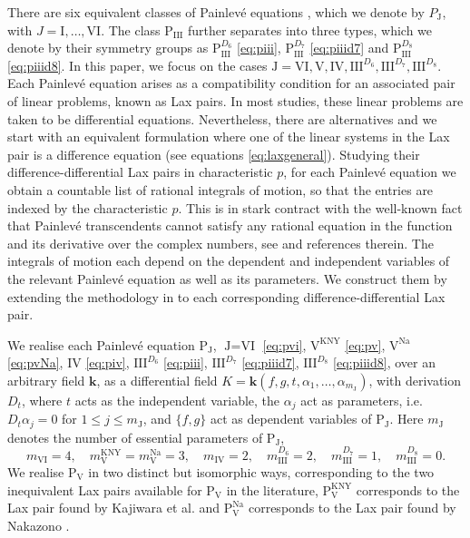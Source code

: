 \documentclass[a4paper,reqno]{amsart}
\numberwithin{equation}{section}
\numberwithin{figure}{section}
\theoremstyle{remark}
\newcommand\Pthree{\textrm{P}_{\textrm{III}}}
\newcommand\Pfive{\textrm{P}_{\textrm{V}}}
\newcommand\PJ{\textrm{P}_{\textrm{J}}}
\begin{document}
There are six equivalent classes of Painlev\'e equations \cite[\href{https://dlmf.nist.gov/32.2}{(32.2)}]{NIST:DLMF}, which we denote by $P_{\textrm{J}}$, with $J=\textrm{I},\ldots, \textrm{VI}$. The class $\Pthree$ further separates into three types, which we denote by their symmetry groups as $\Pthree^{D_6}$  \eqref{eq:piii}, $\Pthree^{D_7}$  \eqref{eq:piiid7} and $\Pthree^{D_8}$  \eqref{eq:piiid8}. In this paper, we focus on the cases $\textrm{J}=\textrm{VI},\textrm{V},\textrm{IV},\textrm{III}^{D_6},\textrm{III}^{D_7},\textrm{III}^{D_8}$. Each Painlev\'e equation arises as a compatibility condition for an associated pair of linear problems, known as Lax pairs. In most studies, these linear problems are taken to be differential equations. Nevertheless, there are alternatives and we start with an equivalent formulation where one of the linear systems in the Lax pair is a difference equation (see equations \eqref{eq:laxgeneral}). Studying their difference-differential Lax pairs in characteristic $p$, for each Painlev\'e equation we obtain a countable list of rational integrals of motion, so that the entries are indexed by the characteristic $p$.
This is in stark contract with the well-known fact that Painlev\'e transcendents cannot satisfy any rational equation in the function and its derivative over the complex numbers, see \cite{umemura1998painleve,nagloo_21,nagloo_pillay_14} and references therein. The integrals of motion each depend on the dependent and independent variables of the relevant Painlev\'e equation as well as its parameters. We construct them by extending the methodology in \cite{joshiroffelsen} to each corresponding difference-differential Lax pair.

We realise each Painlev\'e equation $\PJ$, $\textrm{J}=\textrm{VI}$ \eqref{eq:pvi}, $\textrm{V}^\text{KNY}$ \eqref{eq:pv}, $\textrm{V}^\text{Na}$ \eqref{eq:pvNa}, $\textrm{IV}$ \eqref{eq:piv}, $\textrm{III}^{D_6}$ \eqref{eq:piii}, $\textrm{III}^{D_7}$ \eqref{eq:piiid7}, $\textrm{III}^{D_8}$ \eqref{eq:piiid8}, over an arbitrary field $\mathbf{k}$, as a differential field $K=\mathbf{k}(f,g,t,\alpha_1,\ldots,\alpha_{m_{\textrm{J}}})$, with derivation $D_t$, where $t$ acts as the independent variable, the $\alpha_j$ act as parameters, i.e. $D_t\alpha_j=0$ for $1\leq j\leq m_{\textrm{J}}$, and $\{f,g\}$ act as dependent variables of $\PJ$. Here $m_{\textrm{J}}$ denotes the number of essential parameters of $\PJ$,
\begin{equation*}
    m_\textrm{VI}=4,\quad m_\textrm{V}^\text{KNY}=m_\textrm{V}^\text{Na}=3,\quad m_\textrm{IV}=2,\quad m_\textrm{III}^{D_6}=2,\quad m_\textrm{III}^{D_7}=1,\quad m_\textrm{III}^{D_8}=0.
\end{equation*}
We realise $\Pfive$ in two distinct but isomorphic ways, corresponding to the two inequivalent Lax pairs available for $\Pfive$ in the literature,
$\Pfive^\text{KNY}$ corresponds to the Lax pair found by Kajiwara et al. \cite{KNY2017} and 
$\Pfive^\text{Na}$ corresponds to the Lax pair found by Nakazono \cite{nakazono_lax}.
\end{document}
